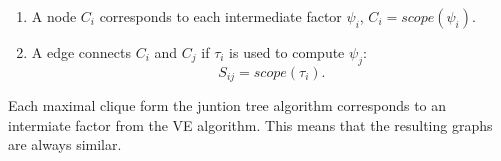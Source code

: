 \documentclass[11pt]{article}
\theoremstyle{definition}
\begin{document}
\begin{enumerate}
  \item A node \( C_{i} \) corresponds to each intermediate factor \( \psi_{i} \), \( C_{i} = scope(\psi_{i}) \).
  \item A edge connects \( C_{i} \) and \( C_{j} \) if \( \tau_{i} \) is used to compute \( \psi_{j} \):
        \[
        S_{ij} = scope(\tau_{i}).
        \]
\end{enumerate}

Each maximal clique form the juntion tree algorithm corresponds to an intermiate factor from the VE algorithm. This means that the resulting graphs are always similar.


\clearpage
\nocite{*}


\end{document}
